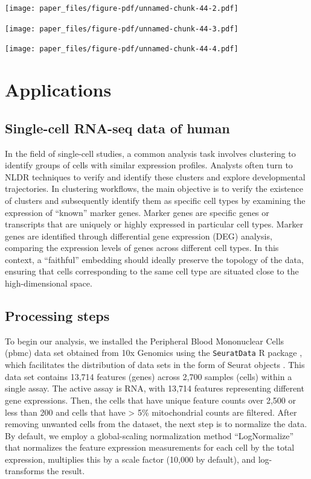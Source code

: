 \documentclass[
  12pt]{article}
\begin{document}
\texttt{[image: paper\_files/figure-pdf/unnamed-chunk-44-2.pdf]}

\texttt{[image: paper\_files/figure-pdf/unnamed-chunk-44-3.pdf]}

\texttt{[image: paper\_files/figure-pdf/unnamed-chunk-44-4.pdf]}

\hypertarget{sec-applications}{%
\section{Applications}\label{sec-applications}}

\hypertarget{single-cell-rna-seq-data-of-human}{%
\subsection{Single-cell RNA-seq data of
human}\label{single-cell-rna-seq-data-of-human}}

In the field of single-cell studies, a common analysis task involves
clustering to identify groups of cells with similar expression profiles.
Analysts often turn to NLDR techniques to verify and identify these
clusters and explore developmental trajectories. In clustering
workflows, the main objective is to verify the existence of clusters and
subsequently identify them as specific cell types by examining the
expression of ``known'' marker genes. Marker genes are specific genes or
transcripts that are uniquely or highly expressed in particular cell
types. Marker genes are identified through differential gene expression
(DEG) analysis, comparing the expression levels of genes across
different cell types. In this context, a ``faithful'' embedding should
ideally preserve the topology of the data, ensuring that cells
corresponding to the same cell type are situated close to the
high-dimensional space.

\hypertarget{processing-steps}{%
\subsection{Processing steps}\label{processing-steps}}

To begin our analysis, we installed the Peripheral Blood Mononuclear
Cells (pbmc) data set obtained from 10x Genomics using the
\texttt{SeuratData} R package \citep{Rahul2019}, which facilitates the
distribution of data sets in the form of Seurat objects
\citep{Yuhan2021}. This data set contains 13,714 features (genes) across
2,700 samples (cells) within a single assay. The active assay is RNA,
with 13,714 features representing different gene expressions. Then, the
cells that have unique feature counts over 2,500 or less than 200 and
cells that have \textgreater{} 5\% mitochondrial counts are filtered.
After removing unwanted cells from the dataset, the next step is to
normalize the data. By default, we employ a global-scaling normalization
method ``LogNormalize'' that normalizes the feature expression
measurements for each cell by the total expression, multiplies this by a
scale factor (10,000 by default), and log-transforms the result.
\end{document}
